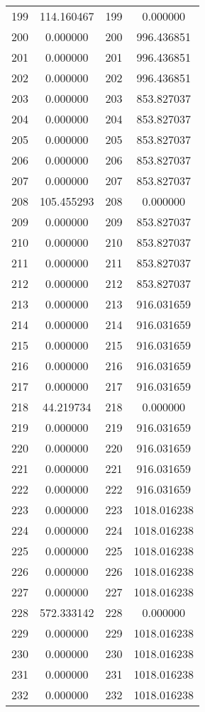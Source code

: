 \documentclass[12pt]{article}
\begin{document}
\begin{longtable}{@{}cccc@{}}
199 & 114.160467 & 199 & 0.000000 \\
200 & 0.000000 & 200 & 996.436851 \\
201 & 0.000000 & 201 & 996.436851 \\
202 & 0.000000 & 202 & 996.436851 \\
203 & 0.000000 & 203 & 853.827037 \\
204 & 0.000000 & 204 & 853.827037 \\
205 & 0.000000 & 205 & 853.827037 \\
206 & 0.000000 & 206 & 853.827037 \\
207 & 0.000000 & 207 & 853.827037 \\
208 & 105.455293 & 208 & 0.000000 \\
209 & 0.000000 & 209 & 853.827037 \\
210 & 0.000000 & 210 & 853.827037 \\
211 & 0.000000 & 211 & 853.827037 \\
212 & 0.000000 & 212 & 853.827037 \\
213 & 0.000000 & 213 & 916.031659 \\
214 & 0.000000 & 214 & 916.031659 \\
215 & 0.000000 & 215 & 916.031659 \\
216 & 0.000000 & 216 & 916.031659 \\
217 & 0.000000 & 217 & 916.031659 \\
218 & 44.219734 & 218 & 0.000000 \\
219 & 0.000000 & 219 & 916.031659 \\
220 & 0.000000 & 220 & 916.031659 \\
221 & 0.000000 & 221 & 916.031659 \\
222 & 0.000000 & 222 & 916.031659 \\
223 & 0.000000 & 223 & 1018.016238 \\
224 & 0.000000 & 224 & 1018.016238 \\
225 & 0.000000 & 225 & 1018.016238 \\
226 & 0.000000 & 226 & 1018.016238 \\
227 & 0.000000 & 227 & 1018.016238 \\
228 & 572.333142 & 228 & 0.000000 \\
229 & 0.000000 & 229 & 1018.016238 \\
230 & 0.000000 & 230 & 1018.016238 \\
231 & 0.000000 & 231 & 1018.016238 \\
232 & 0.000000 & 232 & 1018.016238 \\

\end{longtable}
\end{document}
